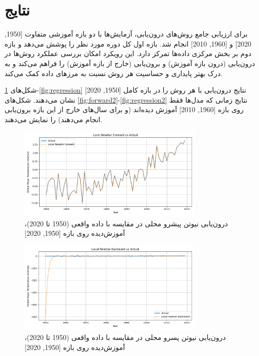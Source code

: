 \section{نتایج}

برای ارزیابی جامع روش‌های درون‌یابی، آزمایش‌ها با دو بازه آموزشی متفاوت [1950, 2020] و [1960, 2010] انجام شد. بازه اول کل دوره مورد نظر را پوشش می‌دهد و بازه دوم بر بخش مرکزی داده‌ها تمرکز دارد. این رویکرد امکان بررسی عملکرد روش‌ها در درون‌یابی (درون بازه آموزش) و برون‌یابی (خارج از بازه آموزش) را فراهم می‌کند و به درک بهتر پایداری و حساسیت هر روش نسبت به مرزهای داده کمک می‌کند.

شکل‌های \ref{fig:forward}-\ref{fig:regression} نتایج درون‌یابی با هر روش را در بازه کامل [1950, 2020] نشان می‌دهند. شکل‌های \ref{fig:forward2}-\ref{fig:regression2} نتایج زمانی که مدل‌ها فقط روی بازه [1960, 2010] آموزش دیده‌اند (و برای سال‌های خارج از این بازه برون‌یابی انجام می‌دهند) را نمایش می‌دهند.

\begin{figure}[htbp]
    \centering
    \includegraphics[width=0.8\textwidth]{../figs/Local_Newton_Forward_vs_actual[1950, 2020, 1].png}
    \caption{درون‌یابی نیوتن پیشرو محلی در مقایسه با داده واقعی (1950 تا 2020)، آموزش‌دیده روی بازه [1950, 2020]}
    \label{fig:forward}
\end{figure}

\begin{figure}[htbp]
    \centering
    \includegraphics[width=0.8\textwidth]{../figs/Local_Newton_Backward_vs_actual[1950, 2020, 1].png}
    \caption{درون‌یابی نیوتن پسرو محلی در مقایسه با داده واقعی (1950 تا 2020)، آموزش‌دیده روی بازه [1950, 2020]}
    \label{fig:backward}
\end{figure}

